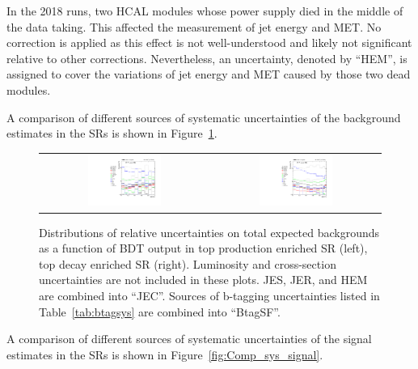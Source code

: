 In the 2018 runs, two HCAL modules whose power supply died in the middle of the data taking. This affected the measurement of jet energy and \ac{MET}. No correction is applied as this effect is not well-understood and likely not significant relative to other corrections. Nevertheless, an uncertainty, denoted by ``HEM'', is assigned to cover the variations of jet energy and \ac{MET} caused by those two dead modules. 

A comparison of different sources of systematic uncertainties of the background estimates in the \acp{SR} is shown in Figure~\ref{fig:Comp_sys_background}.

\begin{figure}[tbh!]
 \begin{center}
 \begin{tabular}{cc}
  \includegraphics[width=0.45\textwidth]{figures/Part3/Systematics/sysBDT_ST_bkg_2017}&
 \includegraphics[width=0.45\textwidth]{figures/Part3/Systematics/sysBDT_TT_bkg_2017} \\
 \end{tabular}
 \caption{Distributions of relative uncertainties on total expected backgrounds as a function of \ac{BDT} output in top production enriched \ac{SR} (left), top decay enriched \ac{SR} (right). Luminosity and cross-section uncertainties are not included in these plots. \ac{JES}, \ac{JER}, and HEM are combined into ``JEC''. Sources of b-tagging uncertainties listed in Table~\ref{tab:btagsys} are combined into ``BtagSF''.}
 \label{fig:Comp_sys_background}
 \end{center}
\end{figure}

A comparison of different sources of systematic uncertainties of the signal estimates in the \acp{SR} is shown in Figure~\ref{fig:Comp_sys_signal}.

